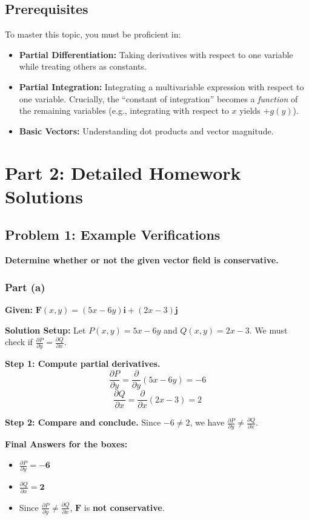 \documentclass[12pt]{article}
\begin{document}
\subsection{Prerequisites}
To master this topic, you must be proficient in:
\begin{itemize}
    \item \textbf{Partial Differentiation:} Taking derivatives with respect to one variable while treating others as constants.
    \item \textbf{Partial Integration:} Integrating a multivariable expression with respect to one variable. Crucially, the ``constant of integration'' becomes a \textit{function} of the remaining variables (e.g., integrating with respect to $x$ yields $+ g(y)$).
    \item \textbf{Basic Vectors:} Understanding dot products and vector magnitude.
\end{itemize}

\newpage
\section{Part 2: Detailed Homework Solutions}

\subsection{Problem 1: Example Verifications}
\textbf{Determine whether or not the given vector field is conservative.}

\subsubsection*{Part (a)}
\textbf{Given:} $\mathbf{F}(x, y) = (5x - 6y)\mathbf{i} + (2x - 3)\mathbf{j}$

\textbf{Solution Setup:}
Let $P(x, y) = 5x - 6y$ and $Q(x, y) = 2x - 3$. We must check if $\frac{\partial P}{\partial y} = \frac{\partial Q}{\partial x}$.

\textbf{Step 1: Compute partial derivatives.}
\[
\frac{\partial P}{\partial y} = \frac{\partial}{\partial y}(5x - 6y) = -6
\]
\[
\frac{\partial Q}{\partial x} = \frac{\partial}{\partial x}(2x - 3) = 2
\]

\textbf{Step 2: Compare and conclude.}
Since $-6 \neq 2$, we have $\frac{\partial P}{\partial y} \neq \frac{\partial Q}{\partial x}$. 

\textbf{Final Answers for the boxes:}
\begin{itemize}
    \item $\frac{\partial P}{\partial y} = \mathbf{-6}$
    \item $\frac{\partial Q}{\partial x} = \mathbf{2}$
    \item Since $\frac{\partial P}{\partial y} \neq \frac{\partial Q}{\partial x}$, $\mathbf{F}$ is \textbf{not conservative}.
\end{itemize}
\end{document}

